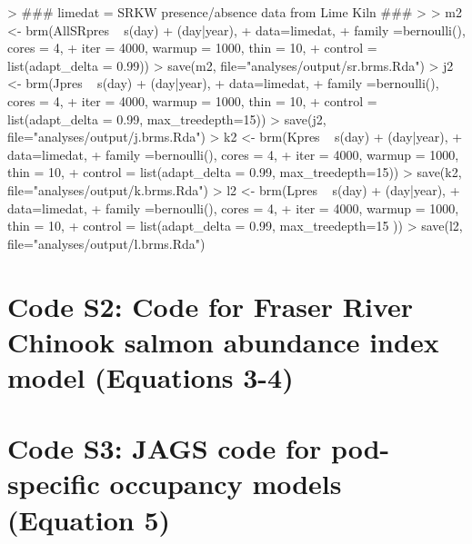 \documentclass{article}
\begin{document}
\begin{Schunk}
\begin{Sinput}
> ### limedat = SRKW presence/absence data from Lime Kiln ###
> 
> m2 <- brm(AllSRpres ~ s(day) + (day|year),
+           data=limedat,
+           family =bernoulli(), cores = 4,
+           iter = 4000, warmup = 1000, thin = 10,
+           control = list(adapt_delta = 0.99))
> save(m2, file="analyses/output/sr.brms.Rda")
> j2 <- brm(Jpres ~ s(day) + (day|year),
+           data=limedat,
+           family =bernoulli(), cores = 4,
+           iter = 4000, warmup = 1000, thin = 10,
+           control = list(adapt_delta = 0.99, max_treedepth=15))
> save(j2, file="analyses/output/j.brms.Rda")
> k2 <- brm(Kpres ~ s(day) + (day|year),
+           data=limedat,
+           family =bernoulli(), cores = 4,
+           iter = 4000, warmup = 1000, thin = 10,
+           control = list(adapt_delta = 0.99, max_treedepth=15))
> save(k2, file="analyses/output/k.brms.Rda")
> l2 <- brm(Lpres ~ s(day) + (day|year),
+           data=limedat,
+           family =bernoulli(), cores = 4,
+           iter = 4000, warmup = 1000, thin = 10,
+           control = list(adapt_delta = 0.99, max_treedepth=15 ))
> save(l2, file="analyses/output/l.brms.Rda")
\end{Sinput}
\end{Schunk}

\section*{Code S2: Code for Fraser River Chinook salmon abundance index model 
(Equations 3-4)}

\begin{Schunk}
\end{Schunk}

\section*{Code S3: JAGS code for pod-specific occupancy models (Equation 5)}
\end{document}
